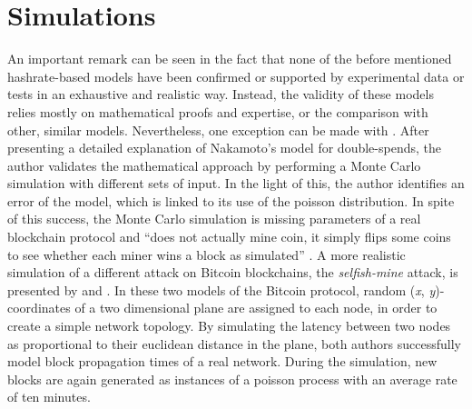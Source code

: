 \documentclass[a4paper,12pt,twoside]{report}
\begin{document}
\section{Simulations}
An important remark can be seen in the fact that none of the before mentioned hashrate-based models have been confirmed or supported by experimental data or tests in an exhaustive and realistic way. Instead, the validity of these models relies mostly on mathematical proofs and expertise, or the comparison with other, similar models. Nevertheless, one exception can be made with \cite{NakamotoExplMCSim}. After presenting a detailed explanation of Nakamoto's model for double-spends, the author validates the mathematical approach by performing a Monte Carlo simulation \cite{montecarlo} with different sets of input. In the light of this, the author identifies an error of the model, which is linked to its use of the poisson distribution. In spite of this success, the Monte Carlo simulation is missing parameters of a real blockchain protocol and ``does not actually
mine coin, it simply flips some coins to see whether each miner wins a block as simulated'' \cite{NakamotoExplMCSim}. A more realistic simulation of a different attack on Bitcoin blockchains, the \textit{selfish-mine} attack, is presented by \cite{mwalemodel} and \cite{selfishmine2}. In these two models of the Bitcoin protocol, random (\textit{x}, \textit{y})-coordinates of a two dimensional plane are assigned to each node, in order to create a simple network topology. By simulating the latency between two nodes as proportional to their euclidean distance in the plane, both authors successfully model block propagation times of a real network. During the simulation, new blocks are again generated as instances of a poisson process with an average rate of ten minutes. 
\end{document}
